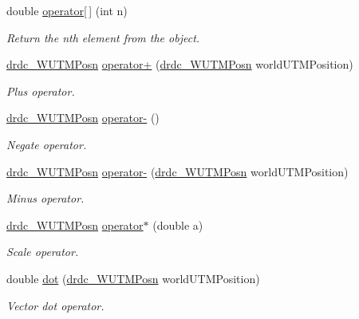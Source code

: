 \begin{CompactItemize}
double \hyperlink{classdrdc__WUTMPosn_48d0a9be9ae8c4d0fe65f4c6c7dafb46}{operator\mbox{[}$\,$\mbox{]}} (int n)
\begin{CompactList}\small\item\em Return the nth element from the object. \item\end{CompactList}\item 
\hyperlink{classdrdc__WUTMPosn}{drdc\_\-WUTMPosn} \hyperlink{classdrdc__WUTMPosn_243334e7b04a731573a2d2fc875377b6}{operator+} (\hyperlink{classdrdc__WUTMPosn}{drdc\_\-WUTMPosn} worldUTMPosition)
\begin{CompactList}\small\item\em Plus operator. \item\end{CompactList}\item 
\hyperlink{classdrdc__WUTMPosn}{drdc\_\-WUTMPosn} \hyperlink{classdrdc__WUTMPosn_54f6cc02b2435080a081ad979cf36480}{operator-} ()
\begin{CompactList}\small\item\em Negate operator. \item\end{CompactList}\item 
\hyperlink{classdrdc__WUTMPosn}{drdc\_\-WUTMPosn} \hyperlink{classdrdc__WUTMPosn_94275ec1d96ae6a0e1740346e79c6a14}{operator-} (\hyperlink{classdrdc__WUTMPosn}{drdc\_\-WUTMPosn} worldUTMPosition)
\begin{CompactList}\small\item\em Minus operator. \item\end{CompactList}\item 
\hyperlink{classdrdc__WUTMPosn}{drdc\_\-WUTMPosn} \hyperlink{classdrdc__WUTMPosn_40f35ee9635745a294b204d70364a886}{operator$\ast$} (double a)
\begin{CompactList}\small\item\em Scale operator. \item\end{CompactList}\item 
double \hyperlink{classdrdc__WUTMPosn_718e139e68caf39f65c919f55d76b1fc}{dot} (\hyperlink{classdrdc__WUTMPosn}{drdc\_\-WUTMPosn} worldUTMPosition)
\begin{CompactList}\small\item\em Vector dot operator. \item\end{CompactList}\item 

\end{CompactItemize}
